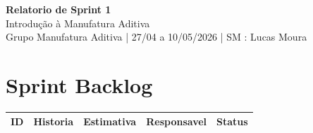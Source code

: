 \documentclass [12 pt ,a4 paper]{article}
\newcommand {\projetotitulo}{Introdução à Manufatura Aditiva}
\newcommand {\grupoid}{Grupo Manufatura Aditiva}
\newcommand {\sprintnum}{1}
\newcommand {\sprintperiodo}{27/04 a 10/05/2026}
\newcommand {\scrummaster}{Lucas Moura}
\begin{document}
\begin {center}
{\Large \bfseries Relatorio de Sprint \sprintnum}\\
{\large \projetotitulo }\\
\grupoid {} | \sprintperiodo {} | SM : \scrummaster
\end {center}
\section{Sprint Backlog}
\begin{longtable}{%
    c
    p{6.8cm}
    p{2cm}
    p{2.8cm}
    p{1.8cm}
}
\toprule
\textbf{ID} & \textbf{Historia} & \textbf{Estimativa} & \textbf{Responsavel} & \textbf{Status} \\
\midrule
\endhead %


\end{longtable}
\end{document}
